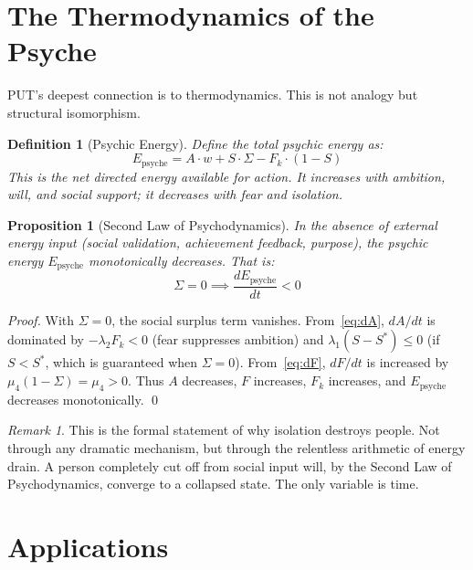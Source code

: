 \documentclass[12pt, a4paper]{article}
\newtheorem{definition}{Definition}[section]
\newtheorem{proposition}{Proposition}[section]
\theoremstyle{remark}
\newtheorem{remark}{Remark}[section]
\newcommand{\Fk}{F_k}
\newcommand{\ddt}[1]{\frac{d#1}{dt}}
\begin{document}
\section{The Thermodynamics of the Psyche}

PUT's deepest connection is to thermodynamics. This is not analogy
but structural isomorphism.

\begin{definition}[Psychic Energy]
Define the total psychic energy as:
\begin{equation}
    E_{\text{psyche}} = A \cdot w + S \cdot \Sigma - \Fk \cdot (1 - S)
\end{equation}
This is the net directed energy available for action. It increases with
ambition, will, and social support; it decreases with fear and isolation.
\end{definition}

\begin{proposition}[Second Law of Psychodynamics]\label{prop:entropy}
In the absence of external energy input (social validation, achievement
feedback, purpose), the psychic energy $E_{\text{psyche}}$ monotonically
decreases. That is:
\begin{equation}
    \Sigma = 0 \implies \ddt{E_{\text{psyche}}} < 0
\end{equation}
\end{proposition}

\begin{proof}
With $\Sigma = 0$, the social surplus term vanishes. From~\eqref{eq:dA},
$dA/dt$ is dominated by $-\lambda_2 \Fk < 0$ (fear suppresses ambition)
and $\lambda_1(S - S^*) \leq 0$ (if $S < S^*$, which is guaranteed when
$\Sigma = 0$). From~\eqref{eq:dF}, $dF/dt$ is increased by
$\mu_4(1 - \Sigma) = \mu_4 > 0$. Thus $A$ decreases, $F$ increases,
$\Fk$ increases, and $E_{\text{psyche}}$ decreases monotonically. \qed
\end{proof}

\begin{remark}
This is the formal statement of why isolation destroys people. Not through
any dramatic mechanism, but through the relentless arithmetic of energy
drain. A person completely cut off from social input will, by the Second
Law of Psychodynamics, converge to a collapsed state. The only variable
is time.
\end{remark}

\section{Applications}
\end{document}
